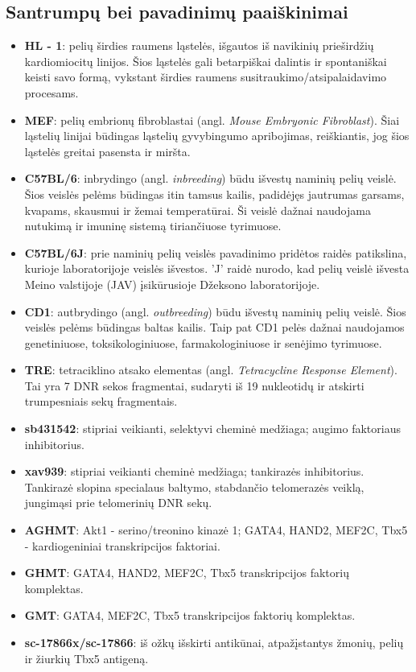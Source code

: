 \documentclass[12pt]{article}
\begin{document}
\subsection{Santrumpų bei pavadinimų paaiškinimai}
\begin{itemize}
    \item \textbf{HL - 1}: pelių širdies raumens ląstelės, išgautos iš
        navikinių prieširdžių kardiomiocitų linijos. Šios ląstelės gali
        betarpiškai dalintis ir spontaniškai keisti savo formą, vykstant
        širdies raumens susitraukimo/atsipalaidavimo procesams.
    \item \textbf{MEF}: pelių embrionų fibroblastai (angl. \emph{Mouse
        Embryonic Fibroblast}). Šiai ląstelių linijai būdingas ląstelių
        gyvybingumo apribojimas, reiškiantis, jog šios ląstelės greitai
        pasensta ir miršta.
    \item \textbf{C57BL/6}: inbrydingo (angl. \emph{inbreeding}) būdu išvestų
        naminių pelių veislė. Šios veislės pelėms būdingas itin tamsus
        kailis, padidėjęs jautrumas garsams, kvapams, skausmui ir žemai
        temperatūrai. Ši veislė dažnai naudojama nutukimą ir imuninę sistemą
        tiriančiuose tyrimuose.
    \item \textbf{C57BL/6J}: prie naminių pelių veislės pavadinimo pridėtos
        raidės patikslina, kurioje laboratorijoje veislės išvestos. 'J' raidė
        nurodo, kad pelių veislė išvesta Meino valstijoje (JAV) įsikūrusioje
        Džeksono laboratorijoje\cite{JCKSLAB}.
    \item \textbf{CD1}: autbrydingo (angl. \emph{outbreeding}) būdu išvestų
        naminių pelių veislė. Šios veislės pelėms būdingas baltas kailis.
        Taip pat CD1 pelės dažnai naudojamos genetiniuose, toksikologiniuose,
        farmakologiniuose ir senėjimo tyrimuose.
    \item \textbf{TRE}: tetraciklino atsako elementas (angl. \emph{Tetracycline
        Response Element}). Tai yra 7 DNR sekos fragmentai,
        sudaryti iš 19 nukleotidų ir atskirti trumpesniais sekų fragmentais.
    \item \textbf{sb431542}: stipriai veikianti, selektyvi cheminė medžiaga;
        augimo faktoriaus inhibitorius.
    \item \textbf{xav939}: stipriai veikianti cheminė medžiaga; tankirazės
        inhibitorius. Tankirazė slopina specialaus baltymo, stabdančio
        telomerazės veiklą, jungimąsi prie telomerinių DNR sekų.
    \item \textbf{AGHMT}: Akt1 - serino/treonino kinazė 1; GATA4, HAND2, MEF2C,
        Tbx5 - kardiogeniniai transkripcijos faktoriai.
    \item \textbf{GHMT}: GATA4, HAND2, MEF2C, Tbx5 transkripcijos faktorių
        komplektas.
    \item \textbf{GMT}: GATA4, MEF2C, Tbx5 transkripcijos faktorių komplektas.
    \item \textbf{sc-17866x/sc-17866}: iš ožkų išskirti antikūnai,
        atpažįstantys žmonių, pelių ir žiurkių Tbx5 antigeną.
\end{itemize}
\end{document}
